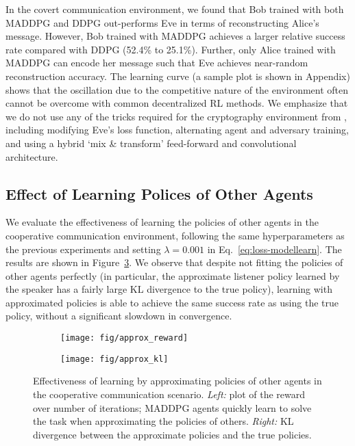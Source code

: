 \documentclass{article}
\begin{document}
In the covert communication environment, we found that Bob trained with both MADDPG and DDPG out-performs Eve in terms of reconstructing Alice's message. However, Bob trained with MADDPG achieves a larger relative success rate compared with DDPG (52.4\% to 25.1\%). Further, only Alice trained with MADDPG can encode her message such that Eve achieves near-random reconstruction accuracy. 
The learning curve (a sample plot is shown in Appendix) shows that the oscillation due to the competitive nature of the environment often cannot be overcome with common decentralized RL methods. We emphasize that we do not use any of the tricks required for the cryptography environment from \cite{abadi2016learning}, including modifying Eve's loss function, alternating agent and adversary training, and using a hybrid `mix \& transform' feed-forward and convolutional architecture.









\subsection{Effect of Learning Polices of Other Agents}

We evaluate the effectiveness of learning the policies of other agents in the cooperative communication environment, following the same hyperparameters as the previous experiments and setting $\lambda=0.001$ in Eq.~\ref{eq:loss-modellearn}. The results are shown in Figure~\ref{fig:approx}. 
We observe that despite not fitting the policies of other agents perfectly (in particular, the approximate listener policy learned by the speaker has a fairly large KL divergence to the true policy), learning with approximated policies is able to achieve the same success rate as using the true policy, without a significant slowdown in convergence.

\begin{figure}
\begin{subfigure}{.5\textwidth}
  \centering
  \texttt{[image: fig/approx\_reward]}
\label{fig:approx_reward}
\end{subfigure}
\begin{subfigure}{.5\textwidth}
  \centering
  \texttt{[image: fig/approx\_kl]}
\label{fig:approx_kl}
\end{subfigure}
\caption{Effectiveness of learning by approximating policies of other agents in the cooperative communication scenario. \textit{Left:} plot of the reward over number of iterations; MADDPG agents quickly learn to solve the task when approximating the policies of others. \textit{Right:} KL divergence between the approximate policies and the true policies. \vspace{-3mm}}\label{fig:approx}
\end{figure}
\end{document}
